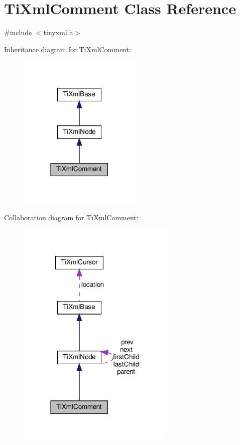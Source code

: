 \hypertarget{classTiXmlComment}{}\section{Ti\+Xml\+Comment Class Reference}
\label{classTiXmlComment}


{\ttfamily \#include $<$tinyxml.\+h$>$}



Inheritance diagram for Ti\+Xml\+Comment\+:
\nopagebreak
\begin{figure}[H]
\begin{center}
\leavevmode
\includegraphics[width=165pt]{classTiXmlComment__inherit__graph}
\end{center}
\end{figure}


Collaboration diagram for Ti\+Xml\+Comment\+:
\nopagebreak
\begin{figure}[H]
\begin{center}
\leavevmode
\includegraphics[width=213pt]{classTiXmlComment__coll__graph}
\end{center}
\end{figure}
